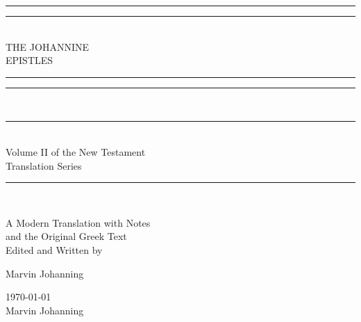\begin{doubletitle}
    \textheight
    \centering
    \vspace*{\baselineskip}
    \rule{\textwidth}{1.6pt}\vspace*{-\baselineskip}\vspace*{2pt}
    \rule{\textwidth}{0.4pt}\\[\baselineskip]
    {\LARGE THE JOHANNINE \\[0.3\baselineskip] EPISTLES }\\[0.2\baselineskip]
    \rule{\textwidth}{0.4pt}\vspace*{-\baselineskip}\vspace{3.2pt}
    \rule{\textwidth}{1.6pt}\\
    
    \scshape
    \rule{\textwidth}{0.4pt}\\[\baselineskip]
    {\Large Volume II of the New Testament \\ Translation Series }\\[0.2\baselineskip]
    \rule{\textwidth}{0.4pt}\vspace*{-\baselineskip}\vspace{3.2pt}\\[\baselineskip]\vspace*{2\baselineskip}
    
    A Modern Translation with Notes \\
    and the Original Greek Text \\
    \vspace*{2\baselineskip}
    Edited and Written by \\[\baselineskip]
    {\Large Marvin Johanning\par}
    \vfill
    {\scshape \monthyeardate\today} \\
    {\large Marvin Johanning}\par
\end{doubletitle}